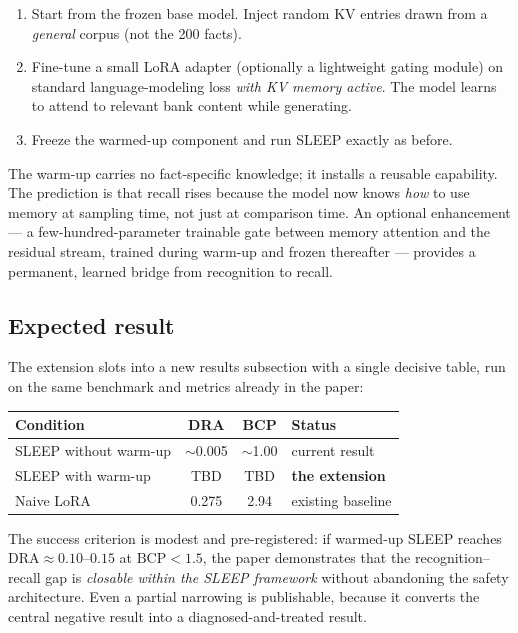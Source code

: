 \documentclass[11pt]{article}
\begin{document}
\begin{enumerate}
  \item Start from the frozen base model. Inject random KV entries drawn from a \emph{general} corpus (not the 200 facts).
  \item Fine-tune a small LoRA adapter (optionally a lightweight gating module) on standard language-modeling loss \emph{with KV memory active}. The model learns to attend to relevant bank content while generating.
  \item Freeze the warmed-up component and run SLEEP exactly as before.
\end{enumerate}

The warm-up carries no fact-specific knowledge; it installs a reusable capability. The prediction is that recall rises because the model now knows \emph{how} to use memory at sampling time, not just at comparison time. An optional enhancement --- a few-hundred-parameter trainable gate between memory attention and the residual stream, trained during warm-up and frozen thereafter --- provides a permanent, learned bridge from recognition to recall.

\subsection{Expected result}
The extension slots into a new results subsection with a single decisive table, run on the same benchmark and metrics already in the paper:

\begin{center}
\begin{tabular}{@{}l c c l@{}}
\toprule
\textbf{Condition} & \textbf{DRA} & \textbf{BCP} & \textbf{Status} \\
\midrule
SLEEP without warm-up & $\sim$0.005 & $\sim$1.00 & current result \\
SLEEP with warm-up    & TBD         & TBD         & \textbf{the extension} \\
Naive LoRA            & 0.275       & 2.94        & existing baseline \\
\bottomrule
\end{tabular}
\end{center}

The success criterion is modest and pre-registered: if warmed-up SLEEP reaches $\mathrm{DRA}\approx0.10$--$0.15$ at $\mathrm{BCP}<1.5$, the paper demonstrates that the recognition--recall gap is \emph{closable within the SLEEP framework} without abandoning the safety architecture. Even a partial narrowing is publishable, because it converts the central negative result into a diagnosed-and-treated result.
\end{document}
